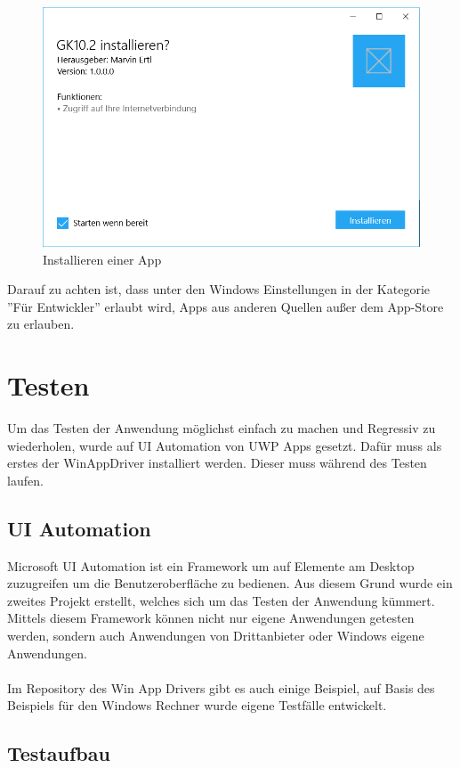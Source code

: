 \begin{figure}[H]
	\centering
	\includegraphics[width=0.7\linewidth]{images/screenshot007}
	\caption{Installieren einer App}
	\label{fig:screenshot007}
\end{figure}

Darauf zu achten ist, dass unter den Windows Einstellungen in der Kategorie ''Für Entwickler'' erlaubt wird, Apps aus anderen Quellen außer dem App-Store zu erlauben.

\section{Testen}

Um das Testen der Anwendung möglichst einfach zu machen und Regressiv zu wiederholen, wurde auf UI Automation von UWP Apps gesetzt. Dafür muss als erstes der WinAppDriver installiert werden. Dieser muss während des Testen laufen. \cite{WinAppDriver} 

\subsection{UI Automation}

Microsoft UI Automation ist ein Framework um auf Elemente am Desktop zuzugreifen um die Benutzeroberfläche zu bedienen. Aus diesem Grund wurde ein zweites Projekt erstellt, welches sich um das Testen der Anwendung kümmert. Mittels diesem Framework können nicht nur eigene Anwendungen getesten werden, sondern auch Anwendungen von Drittanbieter oder Windows eigene Anwendungen. \cite{uiautooverview}
\\\\
Im Repository des Win App Drivers gibt es auch einige Beispiel, auf Basis des Beispiels für den Windows Rechner wurde eigene Testfälle entwickelt. \cite{WinAppDriver}

\subsection{Testaufbau}

